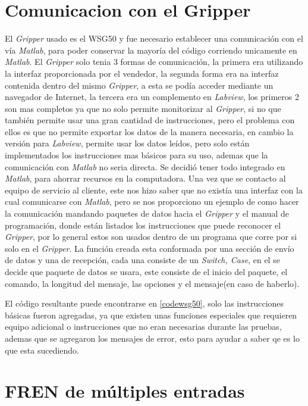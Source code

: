     \section{Comunicacion con el Gripper}
    
	El \textit{Gripper} usado es el WSG50 y fue necesario establecer una comunicación con el vía \textit{Matlab}, para poder conservar la mayoría del código corriendo unicamente en \textit{Matlab}.
	El \textit{Gripper} solo tenia 3 formas de comunicación, la primera era utilizando la interfaz proporcionada  por el vendedor, la segunda forma era na interfaz contenida dentro del mismo \textit{Gripper}, a esta se podía acceder mediante un navegador de Internet, la tercera era un complemento en \textit{Labview}, los primeros 2 son mas completos ya que no solo permite monitorizar al \textit{Gripper}, si no que también permite usar una gran cantidad de instrucciones, pero el problema con ellos es que no permite exportar los datos de la manera necesaria, en cambio la versión para \textit{Labview}, permite usar los datos leídos, pero solo están implementados los instrucciones mas básicos para su uso, ademas que la comunicación con \textit{Matlab} no seria directa.
Se decidió tener todo integrado en \textit{Matlab}, para ahorrar recursos en la computadora.
Una vez que se contacto al equipo de servicio al cliente, este nos hizo saber que no existía una interfaz con la cual comunicarse con \textit{Matlab}, pero se nos proporciono un ejemplo de como hacer la comunicación mandando paquetes de datos hacia el \textit{Gripper} y el manual de programación, donde están listados los instrucciones que puede reconocer el \textit{Gripper}, por lo general estos son usados dentro de un programa que corre por si solo en el \textit{Gripper}.
La función creada esta conformada por una sección de envío de datos y una de recepción, cada una consiste de un \textit{Switch, Case}, en el se decide que paquete de datos se usara, este consiste de el inicio del paquete, el comando, la longitud del mensaje, las opciones y el mensaje(en caso de haberlo).

El código resultante puede encontrarse en \cref{codewsg50}, solo las instrucciones básicas fueron agregadas, ya que existen unas funciones especiales que requieren equipo adicional o instrucciones que no eran necesarias durante las pruebas, ademas que se agregaron los mensajes de error, esto para ayudar a saber qe es lo que esta sucediendo.

    
    \section{FREN de múltiples entradas}
    
